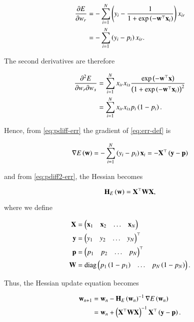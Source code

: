 \documentclass[journal,12pt,twocolumn]{IEEEtran}
\begin{document}
\begin{align}
     \pdiff{w_r}{E} &= -\sum_{i=1}^{N}\brak{y_i - \frac{1}{1 + \exp\brak{-\vec{w}^\top\vec{x}_i}}}x_{ir} \\
                    &= -\sum_{i=1}^{N}\brak{y_i - p_i}x_{ir}.
                    \label{eq:pdiff-err}
\end{align}

The second derivatives are therefore

\begin{align}
     \frac{\partial^2E}{\partial w_r \partial w_s} &= \sum_{i=1}^{N}x_{ir}x_{is}\frac{\exp\brak{-\vec{w}^\top\vec{x}}}{\brak{1 + \exp\brak{-\vec{w}^\top\vec{x}_i}}^2} \\
                                                   &= \sum_{i=1}^{N}x_{ir}x_{is}p_i\brak{1-p_i}.
     \label{eq:pdiff2-err}
\end{align}

Hence, from \eqref{eq:pdiff-err} the gradient of \eqref{eq:err-def} is

\begin{equation}
     \nabla E\brak{\vec{w}} = -\sum_{i=1}^{N}\brak{y_i - p_i}\vec{x}_i = -\vec{X}^\top\brak{\vec{y}-\vec{p}}     
     \label{eq:grad-err}
\end{equation}

and from \eqref{eq:pdiff2-err}, the Hessian becomes

\begin{equation}
     \vec{H}_E\brak{\vec{w}} = \vec{X}^\top\vec{WX},
     \label{eq:hess-err}
\end{equation}

where we define

\begin{align}
     \boldsymbol{\mathbf{X}} &= \begin{pmatrix}\boldsymbol{\mathbf{x}}_1 & \boldsymbol{\mathbf{x}}_2 & \ldots & \boldsymbol{\mathbf{x}}_N\end{pmatrix} \label{eq:X-def} \\
     \boldsymbol{\mathbf{y}} &= \begin{pmatrix}y_1 & y_2 & \ldots & y_N\end{pmatrix}^\top \label{eq:y-def} \\
     \boldsymbol{\mathbf{p}} &= \begin{pmatrix}p_1 & p_2 & \ldots & p_N\end{pmatrix}^\top \label{eq:p-def} \\
     \boldsymbol{\mathbf{W}} &= \mathrm{diag}\begin{pmatrix}p_1\left(1-p_1\right) & \ldots & p_N\left(1-p_N\right)\end{pmatrix}. \label{eq:W-def}
\end{align}

Thus, the Hessian update equation becomes

\begin{align}
     \vec{w}_{n+1} &= \vec{w}_n - \vec{H}_E\brak{\vec{w}_n}^{-1}\nabla E\brak{\vec{w}_n} \\
                   &= \vec{w}_n + \brak{\vec{X}^\top\vec{WX}}^{-1}\vec{X}^\top\brak{\vec{y}-\vec{p}}.
                   \label{eq:hess-upd}
\end{align}
\end{document}
